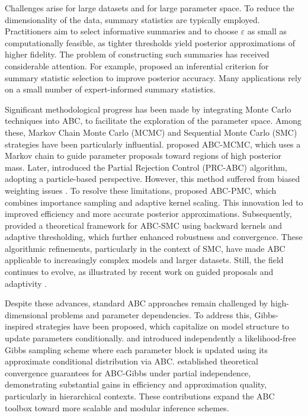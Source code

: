 \documentclass[lineno]{biometrika}
\begin{document}
Challenges arise for large datasets and for large parameter space. 
To reduce the dimensionality of the data, summary statistics are typically employed. Practitioners aim to select informative summaries and to choose $\varepsilon$ as small as computationally feasible, as tighter thresholds yield posterior approximations of higher fidelity. The problem of constructing such summaries has received considerable attention. For example, \citet{fearnheadConstructingSummaryStatistics2012} proposed an inferential criterion for summary statistic selection to improve posterior accuracy. Many applications rely on a small number of expert-informed summary statistics.

Significant methodological progress has been made by integrating Monte Carlo techniques into ABC, to facilitate the exploration of the parameter space. Among these, Markov Chain Monte Carlo (MCMC) and Sequential Monte Carlo (SMC) strategies have been particularly influential. \citet{marjoramMarkovChainMonte2003a} proposed ABC-MCMC, which uses a Markov chain to guide parameter proposals toward regions of high posterior mass. Later, \citet{sisson2007sequential} introduced the Partial Rejection Control (PRC-ABC) algorithm, adopting a particle-based perspective. However, this method suffered from biased weighting issues \citep{sissonCorrectionSissonSequential2009}. 
To resolve these limitations, \citet{beaumontAdaptiveApproximateBayesian2009b} proposed ABC-PMC, which combines importance sampling and adaptive kernel scaling. This innovation led to improved efficiency and more accurate posterior approximations. Subsequently, \citet{delmoralAdaptiveSequentialMonte2012} provided a theoretical framework for ABC-SMC using backward kernels and adaptive thresholding, which further enhanced robustness and convergence. These algorithmic refinements, particularly in the context of SMC, have made ABC applicable to increasingly complex models and larger datasets. Still, the field continues to evolve, as illustrated by recent work on guided proposals and adaptivity \citep{picchini2024guided}.

Despite these advances, standard ABC approaches remain challenged by high-dimensional problems and parameter dependencies. To address this, Gibbs-inspired strategies have been proposed, which capitalize on model structure to update parameters conditionally. \citet{clarte2021componentwise} and \citet{rodrigues2020likelihood} introduced independently a likelihood-free Gibbs sampling scheme where each parameter block is updated using its approximate conditional distribution via ABC. 
\citet{clarte2021componentwise} established theoretical convergence guarantees for ABC-Gibbs under partial independence, demonstrating substantial gains in efficiency and approximation quality, particularly in hierarchical contexts. These contributions expand the ABC toolbox toward more scalable and modular inference schemes.
\end{document}
